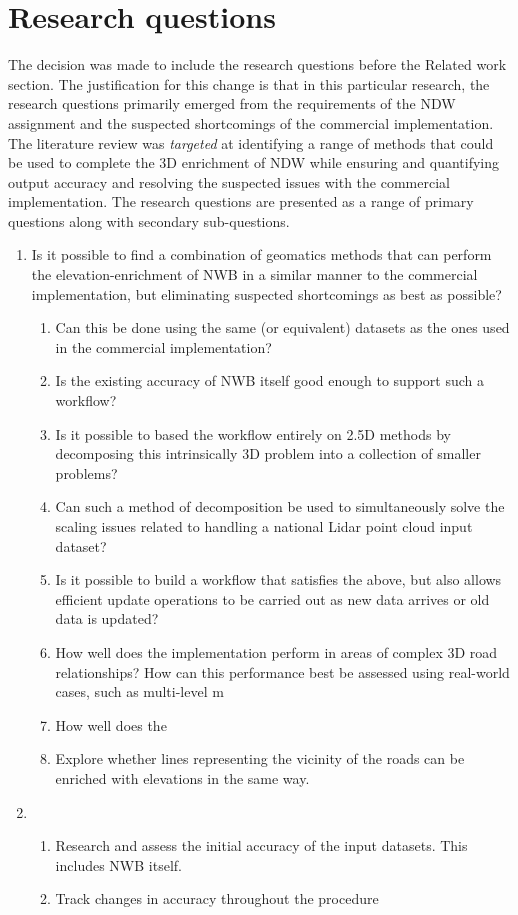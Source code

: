 
\chapter{Research questions}
\label{chap:rq}

The decision was made to include the research questions before the Related work section. The justification for this change is that in this particular research, the research questions primarily emerged from the requirements of the NDW assignment and the suspected shortcomings of the commercial implementation. The literature review was \textit{targeted} at identifying a range of methods that could be used to complete the 3D enrichment of NDW while ensuring and quantifying output accuracy and resolving the suspected issues with the commercial implementation. The research questions are presented as a range of primary questions along with secondary sub-questions.


\begin{enumerate}
\item Is it possible to find a combination of geomatics methods that can perform the elevation-enrichment of NWB in a similar manner to the commercial implementation, but eliminating suspected shortcomings as best as possible?
\begin{enumerate}
    \item Can this be done using the same (or equivalent) datasets as the ones used in the commercial implementation?
    \item Is the existing accuracy of NWB itself good enough to support such a workflow?
    \item Is it possible to based the workflow entirely on 2.5D methods by decomposing this intrinsically 3D problem into a collection of smaller problems?
    \item Can such a method of decomposition be used to simultaneously solve the scaling issues related to handling a national Lidar point cloud input dataset?
    \item Is it possible to build a workflow that satisfies the above, but also allows efficient update operations to be carried out as new data arrives or old data is updated?
    \item How well does the implementation perform in areas of complex 3D road relationships? How can this performance best be assessed using real-world cases, such as multi-level m
    \item How well does the 
    \item Explore whether lines representing the vicinity of the roads can be enriched with elevations in the same way.
\end{enumerate}
\item 
\begin{enumerate}
\item Research and assess the initial accuracy of the input datasets. This includes NWB itself.
\item Track changes in accuracy throughout the procedure
\end{enumerate}
\end{enumerate}